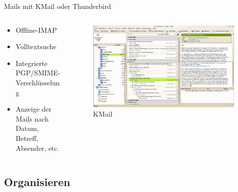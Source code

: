 \begin{frame}{Mails mit KMail oder Thunderbird}
  \begin{columns}
    \begin{column}{0.3\textwidth}
      \begin{itemize}
        \item Offline-IMAP
        \item Volltextsuche
        \item Integrierte PGP/SMIME-Verschlüsselung
        \item Anzeige der Mails nach Datum, Betreff, Absender, etc.
      \end{itemize}      
    \end{column}
    \begin{column}{0.7\textwidth}
      \begin{figure}
        \includegraphics[keepaspectratio=true,width=\textwidth]{kmail}
        \caption{KMail}
      \end{figure}
    \end{column}
  \end{columns}
\end{frame}

\subsection{Organisieren}

